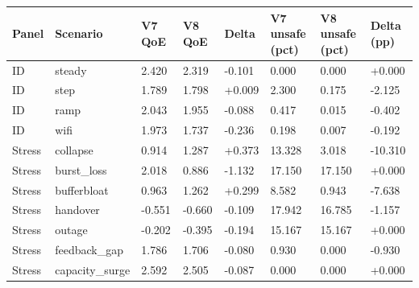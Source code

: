 \begin{tabular}{llllllll}
\toprule
Panel & Scenario & V7 QoE & V8 QoE & Delta & V7 unsafe (pct) & V8 unsafe (pct) & Delta (pp) \\
\midrule
ID & steady & 2.420 & 2.319 & -0.101 & 0.000 & 0.000 & +0.000 \\
ID & step & 1.789 & 1.798 & +0.009 & 2.300 & 0.175 & -2.125 \\
ID & ramp & 2.043 & 1.955 & -0.088 & 0.417 & 0.015 & -0.402 \\
ID & wifi & 1.973 & 1.737 & -0.236 & 0.198 & 0.007 & -0.192 \\
Stress & collapse & 0.914 & 1.287 & +0.373 & 13.328 & 3.018 & -10.310 \\
Stress & burst\_loss & 2.018 & 0.886 & -1.132 & 17.150 & 17.150 & +0.000 \\
Stress & bufferbloat & 0.963 & 1.262 & +0.299 & 8.582 & 0.943 & -7.638 \\
Stress & handover & -0.551 & -0.660 & -0.109 & 17.942 & 16.785 & -1.157 \\
Stress & outage & -0.202 & -0.395 & -0.194 & 15.167 & 15.167 & +0.000 \\
Stress & feedback\_gap & 1.786 & 1.706 & -0.080 & 0.930 & 0.000 & -0.930 \\
Stress & capacity\_surge & 2.592 & 2.505 & -0.087 & 0.000 & 0.000 & +0.000 \\
\bottomrule
\end{tabular}
